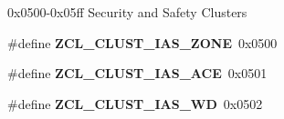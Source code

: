 0x0500-\/0x05ff Security and Safety Clusters \begin{DoxyCompactItemize}
\item 
\hypertarget{group__zcl_ga9b93acd32b917310f0336ac84d7efdea}{\#define {\bfseries Z\-C\-L\-\_\-\-C\-L\-U\-S\-T\-\_\-\-I\-A\-S\-\_\-\-Z\-O\-N\-E}~0x0500}\label{group__zcl_ga9b93acd32b917310f0336ac84d7efdea}

\item 
\hypertarget{group__zcl_ga442974e611b0c74732377892affefd11}{\#define {\bfseries Z\-C\-L\-\_\-\-C\-L\-U\-S\-T\-\_\-\-I\-A\-S\-\_\-\-A\-C\-E}~0x0501}\label{group__zcl_ga442974e611b0c74732377892affefd11}

\item 
\hypertarget{group__zcl_ga4e118fcd980560cb3adb695997a48fd3}{\#define {\bfseries Z\-C\-L\-\_\-\-C\-L\-U\-S\-T\-\_\-\-I\-A\-S\-\_\-\-W\-D}~0x0502}\label{group__zcl_ga4e118fcd980560cb3adb695997a48fd3}

\end{DoxyCompactItemize}
\label{_amgrp01747264fe7bf50731df0522c351974e}%
